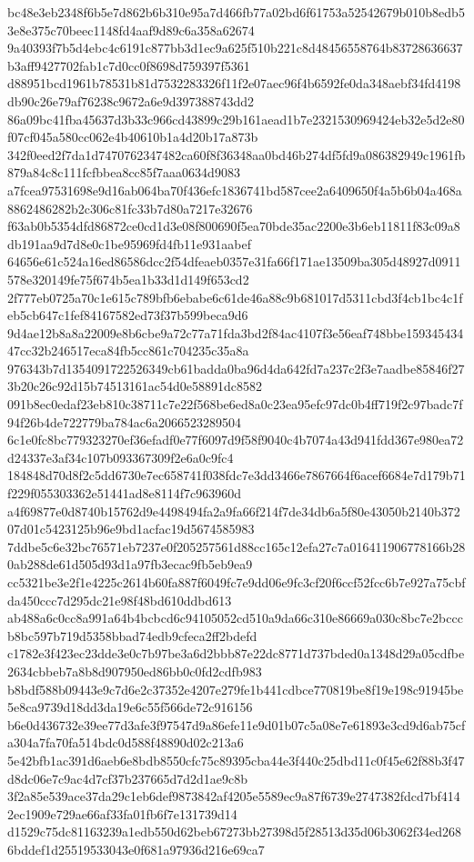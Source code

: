 \documentclass[11pt,a4paper]{article}
\begin{document}
{bc48e3eb2348f6b5e7d862b6b310e95a7d466fb77a02bd6f61753a52542679b010b8edb53e8e375c70beec1148fd4aaf9d89c6a358a62674
9a40393f7b5d4ebc4c6191c877bb3d1ec9a625f510b221c8d48456558764b83728636637b3aff9427702fab1c7d0cc0f8698d759397f5361
d88951bcd1961b78531b81d7532283326f11f2e07aec96f4b6592fe0da348aebf34fd4198db90c26e79af76238c9672a6e9d397388743dd2
86a09bc41fba45637d3b33c966cd43899c29b161aead1b7e2321530969424eb32e5d2e80f07cf045a580cc062e4b40610b1a4d20b17a873b
342f0eed2f7da1d7470762347482ca60f8f36348aa0bd46b274df5fd9a086382949c1961fb879a84c8c111fcfbbea8cc85f7aaa0634d9083
a7fcea97531698e9d16ab064ba70f436efc1836741bd587cee2a6409650f4a5b6b04a468a8862486282b2c306c81fc33b7d80a7217e32676
f63ab0b5354dfd86872ce0cd1d3e08f800690f5ea70bde35ac2200e3b6eb11811f83c09a8db191aa9d7d8e0c1be95969fd4fb11e931aabef
64656e61c524a16ed86586dcc2f54dfeaeb0357e31fa66f171ae13509ba305d48927d0911578e320149fe75f674b5ea1b33d1d149f653cd2
2f777eb0725a70c1e615c789bfb6ebabe6c61de46a88c9b681017d5311cbd3f4cb1bc4c1feb5cb647c1fef84167582ed73f37b599beca9d6
9d4ae12b8a8a22009e8b6cbe9a72c77a71fda3bd2f84ac4107f3e56eaf748bbe15934543447cc32b246517eca84fb5cc861c704235c35a8a
976343b7d1354091722526349cb61badda0ba96d4da642fd7a237c2f3e7aadbe85846f273b20c26c92d15b74513161ac54d0e58891dc8582
091b8ec0edaf23eb810c38711c7e22f568be6ed8a0c23ea95efc97dc0b4ff719f2c97badc7f94f26b4de722779ba784ac6a2066523289504
6c1e0fc8bc779323270ef36efadf0e77f6097d9f58f9040c4b7074a43d941fdd367e980ea72d24337e3af34c107b093367309f2e6a0c9fc4
184848d70d8f2c5dd6730e7ec658741f038fdc7e3dd3466e7867664f6acef6684e7d179b71f229f055303362e51441ad8e8114f7c963960d
a4f69877e0d8740b15762d9e4498494fa2a9fa66f214f7de34db6a5f80e43050b2140b37207d01c5423125b96e9bd1acfac19d5674585983
7ddbe5c6e32bc76571eb7237e0f205257561d88cc165c12efa27c7a016411906778166b280ab288de61d505d93d1a97fb3ecac9fb5eb9ea9
cc5321be3e2f1e4225c2614b60fa887f6049fc7e9dd06e9fc3cf20f6ccf52fcc6b7e927a75cbfda450ccc7d295dc21e98f48bd610ddbd613
ab488a6c0cc8a991a64b4bcbcd6c94105052cd510a9da66c310e86669a030c8bc7e2bcccb8bc597b719d5358bbad74edb9cfeca2ff2bdefd
c1782e3f423ec23dde3e0c7b97be3a6d2bbb87e22dc8771d737bded0a1348d29a05cdfbe2634cbbeb7a8b8d907950ed86bb0c0fd2cdfb983
b8bdf588b09443e9c7d6e2c37352e4207e279fe1b441cdbce770819be8f19e198c91945be5e8ca9739d18dd3da19e6c55f566de72c916156
b6e0d436732e39ee77d3afe3f97547d9a86efe11e9d01b07c5a08e7e61893e3cd9d6ab75cfa304a7fa70fa514bdc0d588f48890d02c213a6
5e42bfb1ac391d6aeb6e8bdb8550cfc75c89395cba44e3f440c25dbd11c0f45e62f88b3f47d8dc06e7c9ac4d7cf37b237665d7d2d1ae9c8b
3f2a85e539ace37da29c1eb6def9873842af4205e5589ec9a87f6739e2747382fdcd7bf4142ec1909e729ae66af33fa01fb6f7e131739d14
d1529c75dc81163239a1edb550d62beb67273bb27398d5f28513d35d06b3062f34ed2686bddef1d25519533043e0f681a97936d216e69ca7
}
\end{document}
